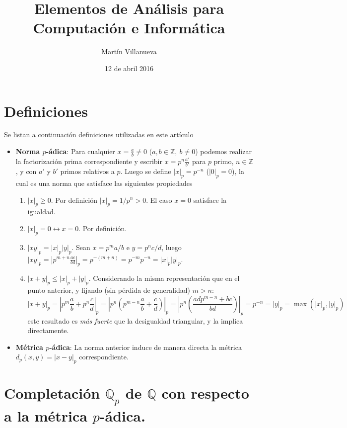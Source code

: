 \documentclass[spanish, fleqn]{article}
\title{Elementos de Análisis para Computación e Informática}
\author{Martín Villanueva}
\date{12 de abril 2016}
\begin{document}
\maketitle

\section{Definiciones}
Se listan a continuación definiciones utilizadas en este artículo

\begin{itemize}
    \item \textbf{Norma $p$-ádica}: Para cualquier $x = \frac{a}{b} \neq 0$ ($a,b \in \mathbb{Z},\ b\neq 0$) podemos realizar la factorización prima correspondiente y escribir $x = p^n \frac{a'}{b'}$ para $p$ primo, $n \in \mathbb{Z}$, y con $a'$ y $b'$ primos relativos a $p$. Luego se define $|x|_p = p^{-n}$ ($|0|_p = 0$), la cual es una norma que satisface las siguientes propiedades
    \begin{enumerate}
        \item $|x|_p \geq 0$. Por definición $|x|_p = 1/p^n > 0$. El caso $x=0$ satisface la igualdad.
        \item $|x|_p = 0 \leftrightarrow x = 0$. Por definición.
        \item $|x y|_p = |x|_p |y|_p$. Sean $x = p^m a/b$ e $y = p^n c/d$, luego $|x y|_p = \left|p^{m+n} \frac{ac}{bd}\right|_p = p^{-(m+n)} = p^{-m} p^{-n} = |x|_p |y|_p$.
        \item $|x+y|_p \leq |x|_p + |y|_p$. Considerando la misma representación que en el punto anterior, y fijando (sin pérdida de generalidad) $m > n$:
        \begin{equation*}
            \left| x+y \right|_p = \left| p^m \frac{a}{b} + p^n \frac{c}{d} \right|_p = \left|p^n \left(p^{m-n}\frac{a}{b} + \frac{c}{d} \right) \right|_p = \left|p^n \left(\frac{a d p^{m-n} + b c}{bd} \right) \right|_p = p^{-n} = |y|_p = \max(|x|_p, |y|_p)
        \end{equation*}
        este resultado es \textit{más fuerte} que la desigualdad triangular, y la implica directamente.
    \end{enumerate}

    \item \textbf{Métrica $p$-ádica}: La norma anterior induce de manera directa la métrica $d_p(x,y) = |x-y|_p$ correspondiente.
\end{itemize}

\section{Completación $\mathbb{Q}_p$ de $\mathbb{Q}$ con respecto a la métrica $p$-ádica.}
\end{document}
